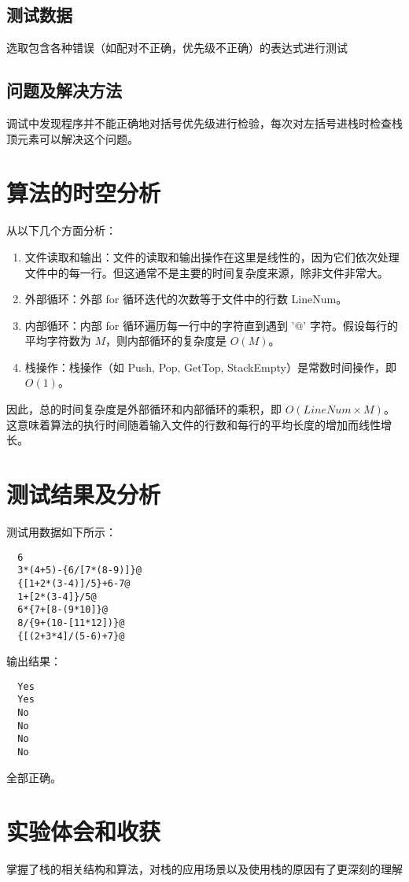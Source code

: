 \documentclass[UTF8]{ctexart}
\begin{document}
\subsection{测试数据}
选取包含各种错误（如配对不正确，优先级不正确）的表达式进行测试
\subsection{问题及解决方法}
调试中发现程序并不能正确地对括号优先级进行检验，每次对左括号进栈时检查栈顶元素可以解决这个问题。
\section{算法的时空分析}
从以下几个方面分析：
\begin{enumerate}
  \item 文件读取和输出：文件的读取和输出操作在这里是线性的，因为它们依次处理文件中的每一行。但这通常不是主要的时间复杂度来源，除非文件非常大。
  \item 外部循环：外部 for 循环迭代的次数等于文件中的行数 LineNum。
  \item 内部循环：内部 for 循环遍历每一行中的字符直到遇到 '@' 字符。假设每行的平均字符数为 $M$，则内部循环的复杂度是 $O(M)$。
  \item 栈操作：栈操作（如 Push, Pop, GetTop, StackEmpty）是常数时间操作，即 $O(1)$。
\end{enumerate}
因此，总的时间复杂度是外部循环和内部循环的乘积，即 $O(LineNum \times M)$。
这意味着算法的执行时间随着输入文件的行数和每行的平均长度的增加而线性增长。
\section{测试结果及分析}
测试用数据如下所示：
\begin{lstlisting}
  6
  3*(4+5)-{6/[7*(8-9)]}@
  {[1+2*(3-4)]/5}+6-7@
  1+[2*(3-4]}/5@
  6*{7+[8-(9*10]}@
  8/{9+(10-[11*12])}@
  {[(2+3*4]/(5-6)+7}@
\end{lstlisting}
输出结果：
\begin{lstlisting}
  Yes
  Yes
  No
  No
  No
  No
\end{lstlisting}
全部正确。
\section{实验体会和收获}
掌握了栈的相关结构和算法，对栈的应用场景以及使用栈的原因有了更深刻的理解
\end{document}

